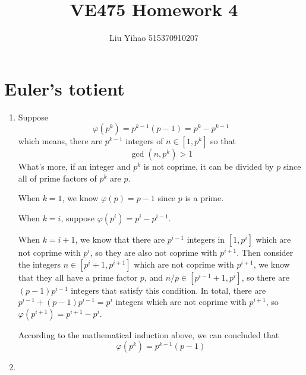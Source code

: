 \documentclass{article}
\title{VE475 Homework 4}
\author{Liu Yihao 515370910207}
\date{}
\begin{document}
\maketitle

\section{Euler's totient}
\begin{enumerate}
\item 
Suppose $$\varphi(p^k)=p^{k-1}(p-1)=p^k-p^{k-1}$$ which means, there are $p^{k-1}$ integers of $n\in[1,p^k]$ so that $$\gcd(n,p^k)>1$$
What's more, if an integer and $p^k$ is not coprime, it can be divided by $p$ since all of prime factors of $p^k$ are $p$.

When $k=1$, we know $\varphi(p)=p-1$ since $p$ is a prime.

When $k=i$, suppose $\varphi(p^i)=p^{i}-p^{i-1}$.

When $k=i+1$, we know that there are $p^{i-1}$ integers in $[1,p^i]$ which are not coprime with $p^i$, so they are also not coprime with $p^{i+1}$. Then consider the integers $n\in[p^i+1,p^{i+1}]$ which are not coprime with $p^{i+1}$, we know that they all have a prime factor $p$, and $n/p\in[p^{i-1}+1,p^i]$, so there are $(p-1)p^{i-1}$ integers that satisfy this condition. In total, there are $p^{i-1}+(p-1)p^{i-1}=p^{i}$ integers which are not coprime with $p^{i+1}$, so $\varphi(p^{i+1})=p^{i+1}-p^i$.

According to the mathematical induction above, we can concluded that $$\varphi(p^k)=p^{k-1}(p-1)$$

\item


\end{enumerate}
\end{document}

